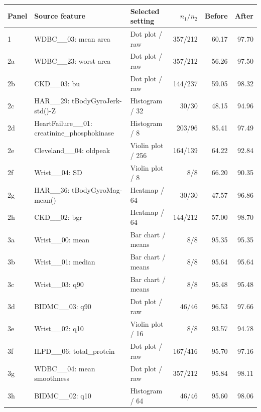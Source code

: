 \begin{longtable}{lp{4.9cm}p{3.1cm}rrr}\toprule
Panel & Source feature & Selected setting & $n_1/n_2$ & Before & After\\\midrule\endhead
1 & WDBC\_\_03: mean area & Dot plot / raw & 357/212 & 60.17 & 97.70\\
2a & WDBC\_\_23: worst area & Dot plot / raw & 357/212 & 56.26 & 97.50\\
2b & CKD\_\_03: bu & Dot plot / raw & 144/237 & 59.05 & 98.32\\
2c & HAR\_\_29: tBodyGyroJerk-std()-Z & Histogram / 32 & 30/30 & 48.15 & 94.96\\
2d & HeartFailure\_\_01: creatinine\_phosphokinase & Histogram / 8 & 203/96 & 85.41 & 97.49\\
2e & Cleveland\_\_04: oldpeak & Violin plot / 256 & 164/139 & 64.22 & 92.84\\
2f & Wrist\_\_04: SD & Violin plot / 8 & 8/8 & 66.20 & 90.35\\
2g & HAR\_\_36: tBodyGyroMag-mean() & Heatmap / 64 & 30/30 & 47.57 & 96.86\\
2h & CKD\_\_02: bgr & Heatmap / 64 & 144/212 & 57.00 & 98.70\\
3a & Wrist\_\_00: mean & Bar chart / means & 8/8 & 95.35 & 95.35\\
3b & Wrist\_\_01: median & Bar chart / means & 8/8 & 95.64 & 95.64\\
3c & Wrist\_\_03: q90 & Bar chart / means & 8/8 & 95.48 & 95.48\\
3d & BIDMC\_\_03: q90 & Dot plot / raw & 46/46 & 96.53 & 97.66\\
3e & Wrist\_\_02: q10 & Violin plot / 16 & 8/8 & 93.57 & 94.78\\
3f & ILPD\_\_06: total\_protein & Dot plot / raw & 167/416 & 95.70 & 97.16\\
3g & WDBC\_\_04: mean smoothness & Dot plot / raw & 357/212 & 95.84 & 98.11\\
3h & BIDMC\_\_02: q10 & Histogram / 64 & 46/46 & 95.60 & 98.06\\
\bottomrule\end{longtable}